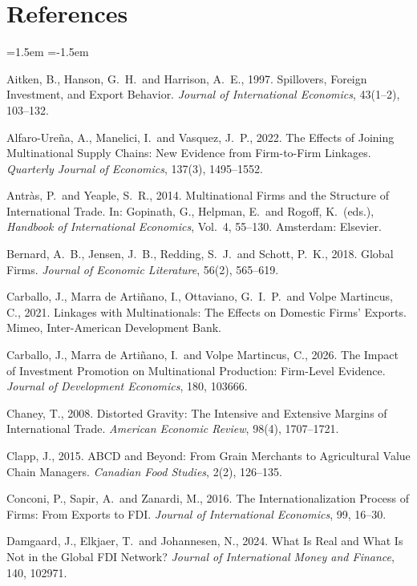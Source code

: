 \documentclass[11pt,a4paper]{article}
\begin{document}
\section*{References}\label{sec:refs}
\begin{list}{}{\leftmargin=1.5em \itemindent=-1.5em \itemsep=2pt \topsep=4pt}
\item Aitken, B., Hanson, G.\ H.\ and Harrison, A.\ E., 1997. Spillovers, Foreign Investment, and
Export Behavior. \emph{Journal of International Economics}, 43(1--2), 103--132.
\item Alfaro-Ure\~na, A., Manelici, I.\ and Vasquez, J.\ P., 2022. The Effects of Joining
Multinational Supply Chains: New Evidence from Firm-to-Firm Linkages. \emph{Quarterly Journal of
Economics}, 137(3), 1495--1552.
\item Antr\`as, P.\ and Yeaple, S.\ R., 2014. Multinational Firms and the Structure of
International Trade. In: Gopinath, G., Helpman, E.\ and Rogoff, K.\ (eds.), \emph{Handbook of
International Economics}, Vol.\ 4, 55--130. Amsterdam: Elsevier.
\item Bernard, A.\ B., Jensen, J.\ B., Redding, S.\ J.\ and Schott, P.\ K., 2018. Global Firms.
\emph{Journal of Economic Literature}, 56(2), 565--619.
\item Carballo, J., Marra de Arti\~nano, I., Ottaviano, G.\ I.\ P.\ and Volpe Martincus, C., 2021.
Linkages with Multinationals: The Effects on Domestic Firms' Exports. Mimeo, Inter-American
Development Bank.
\item Carballo, J., Marra de Arti\~nano, I.\ and Volpe Martincus, C., 2026. The Impact of Investment
Promotion on Multinational Production: Firm-Level Evidence. \emph{Journal of Development
Economics}, 180, 103666.
\item Chaney, T., 2008. Distorted Gravity: The Intensive and Extensive Margins of International
Trade. \emph{American Economic Review}, 98(4), 1707--1721.
\item Clapp, J., 2015. ABCD and Beyond: From Grain Merchants to Agricultural Value Chain Managers.
\emph{Canadian Food Studies}, 2(2), 126--135.
\item Conconi, P., Sapir, A.\ and Zanardi, M., 2016. The Internationalization Process of Firms: From
Exports to FDI. \emph{Journal of International Economics}, 99, 16--30.
\item Damgaard, J., Elkjaer, T.\ and Johannesen, N., 2024. What Is Real and What Is Not in the
Global FDI Network? \emph{Journal of International Money and Finance}, 140, 102971.

\end{list}
\end{document}
